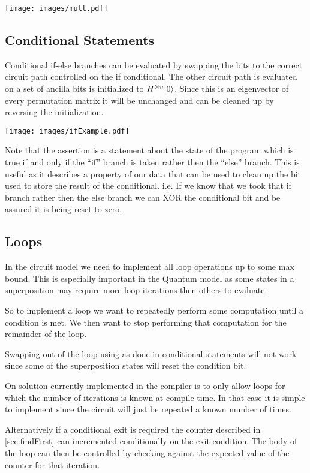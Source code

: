
\texttt{[image: images/mult.pdf]}

\subsection{Conditional Statements}
Conditional if-else branches can be evaluated by swapping the bits to the correct circuit path controlled on the if conditional.
The other circuit path is evaluated on a set of ancilla bits is initialized to $H^{\otimes n}{\left\vert{0}\right\rangle}$.
Since this is an eigenvector of every permutation matrix it will be unchanged and can be cleaned up by reversing the initialization.


\texttt{[image: images/ifExample.pdf]}

Note that the assertion is a statement about the state of the program which is true if and only if the ``if'' branch is taken rather then the ``else'' branch.
This is useful as it describes a property of our data that can be used to clean up the bit used to store the result of the conditional.
i.e. If we know that we took that if branch rather then the else branch we can XOR the conditional bit and be assured it is being reset to zero.


\subsection{Loops}
In the circuit model we need to implement all loop operations up to some max
bound. This is especially important in the Quantum model as some states in a
superposition may require more loop iterations then others to evaluate.

So to implement a loop we want to repeatedly perform some computation until a
condition is met. We then want to stop performing that computation for the
remainder of the loop.

Swapping out of the loop using as done in conditional statements will not work
since some of the superposition states will reset the condition bit.

On solution currently implemented in the compiler is to only allow loops for
which the number of iterations is known at compile time. In that case it is
simple to implement since the circuit will just be repeated a known number of
times.

Alternatively if a conditional exit is required the counter described in
\cref{sec:findFirst} can incremented conditionally on the exit condition.
The body of the loop can then be controlled by checking against the expected
value of the counter for that iteration.
